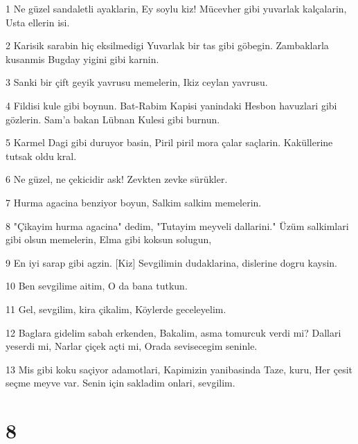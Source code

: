 \par 1 Ne güzel sandaletli ayaklarin, Ey soylu kiz! Mücevher gibi yuvarlak kalçalarin, Usta ellerin isi.
\par 2 Karisik sarabin hiç eksilmedigi Yuvarlak bir tas gibi göbegin. Zambaklarla kusanmis Bugday yigini gibi karnin.
\par 3 Sanki bir çift geyik yavrusu memelerin, Ikiz ceylan yavrusu.
\par 4 Fildisi kule gibi boynun. Bat-Rabim Kapisi yanindaki Hesbon havuzlari gibi gözlerin. Sam'a bakan Lübnan Kulesi gibi burnun.
\par 5 Karmel Dagi gibi duruyor basin, Piril piril mora çalar saçlarin. Kaküllerine tutsak oldu kral.
\par 6 Ne güzel, ne çekicidir ask! Zevkten zevke sürükler.
\par 7 Hurma agacina benziyor boyun, Salkim salkim memelerin.
\par 8 "Çikayim hurma agacina" dedim, "Tutayim meyveli dallarini." Üzüm salkimlari gibi olsun memelerin, Elma gibi koksun solugun,
\par 9 En iyi sarap gibi agzin. [Kiz] Sevgilimin dudaklarina, dislerine dogru kaysin.
\par 10 Ben sevgilime aitim, O da bana tutkun.
\par 11 Gel, sevgilim, kira çikalim, Köylerde geceleyelim.
\par 12 Baglara gidelim sabah erkenden, Bakalim, asma tomurcuk verdi mi? Dallari yeserdi mi, Narlar çiçek açti mi, Orada sevisecegim seninle.
\par 13 Mis gibi koku saçiyor adamotlari, Kapimizin yanibasinda Taze, kuru, Her çesit seçme meyve var. Senin için sakladim onlari, sevgilim.

\chapter{8}

